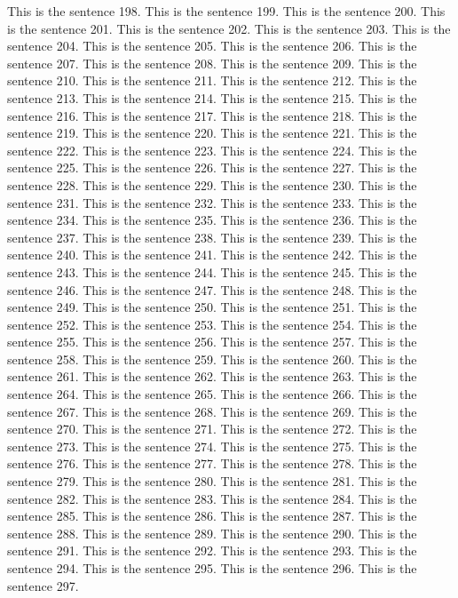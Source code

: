 \documentclass{article}
\begin{document}
This is the sentence 198.
This is the sentence 199.
This is the sentence 200.
This is the sentence 201.
This is the sentence 202.
This is the sentence 203.
This is the sentence 204.
This is the sentence 205.
This is the sentence 206.
This is the sentence 207.
This is the sentence 208.
This is the sentence 209.
This is the sentence 210.
This is the sentence 211.
This is the sentence 212.
This is the sentence 213.
This is the sentence 214.
This is the sentence 215.
This is the sentence 216.
This is the sentence 217.
This is the sentence 218.
This is the sentence 219.
This is the sentence 220.
This is the sentence 221.
This is the sentence 222.
This is the sentence 223.
This is the sentence 224.
This is the sentence 225.
This is the sentence 226.
This is the sentence 227.
This is the sentence 228.
This is the sentence 229.
This is the sentence 230.
This is the sentence 231.
This is the sentence 232.
This is the sentence 233.
This is the sentence 234.
This is the sentence 235.
This is the sentence 236.
This is the sentence 237.
This is the sentence 238.
This is the sentence 239.
This is the sentence 240.
This is the sentence 241.
This is the sentence 242.
This is the sentence 243.
This is the sentence 244.
This is the sentence 245.
This is the sentence 246.
This is the sentence 247.
This is the sentence 248.
This is the sentence 249.
This is the sentence 250.
This is the sentence 251.
This is the sentence 252.
This is the sentence 253.
This is the sentence 254.
This is the sentence 255.
This is the sentence 256.
This is the sentence 257.
This is the sentence 258.
This is the sentence 259.
This is the sentence 260.
This is the sentence 261.
This is the sentence 262.
This is the sentence 263.
This is the sentence 264.
This is the sentence 265.
This is the sentence 266.
This is the sentence 267.
This is the sentence 268.
This is the sentence 269.
This is the sentence 270.
This is the sentence 271.
This is the sentence 272.
This is the sentence 273.
This is the sentence 274.
This is the sentence 275.
This is the sentence 276.
This is the sentence 277.
This is the sentence 278.
This is the sentence 279.
This is the sentence 280.
This is the sentence 281.
This is the sentence 282.
This is the sentence 283.
This is the sentence 284.
This is the sentence 285.
This is the sentence 286.
This is the sentence 287.
This is the sentence 288.
This is the sentence 289.
This is the sentence 290.
This is the sentence 291.
This is the sentence 292.
This is the sentence 293.
This is the sentence 294.
This is the sentence 295.
This is the sentence 296.
This is the sentence 297.
\end{document}
